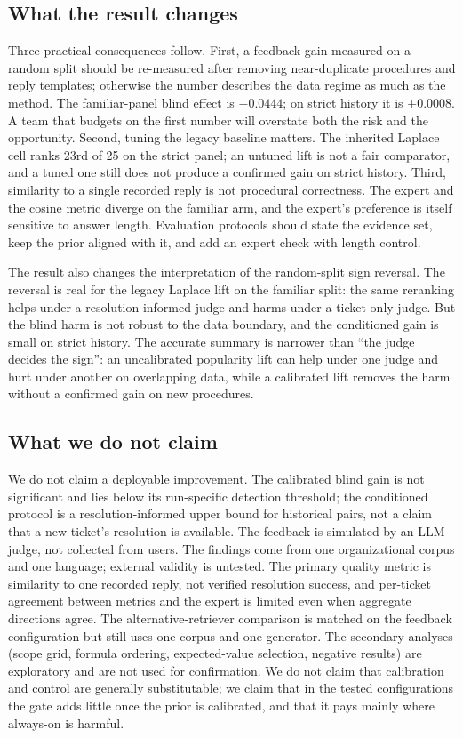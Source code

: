 \documentclass{ieeeaccess}
\begin{document}
\subsection{What the result changes}
Three practical consequences follow. First, a feedback gain measured on a random
split should be re-measured after removing near-duplicate procedures and reply
templates; otherwise the number describes the data regime as much as the method.
The familiar-panel blind effect is $-0.0444$; on strict history it is $+0.0008$.
A team that budgets on the first number will overstate both the risk and the
opportunity. Second, tuning the legacy baseline matters. The inherited Laplace cell
ranks 23rd of 25 on the strict panel; an untuned lift is not a fair comparator, and
a tuned one still does not produce a confirmed gain on strict history. Third,
similarity to a single recorded reply is not procedural correctness. The expert and
the cosine metric diverge on the familiar arm, and the expert's preference is
itself sensitive to answer length. Evaluation protocols should state the evidence
set, keep the prior aligned with it, and add an expert check with length control.

The result also changes the interpretation of the random-split sign reversal. The
reversal is real for the legacy Laplace lift on the familiar split: the same
reranking helps under a resolution-informed judge and harms under a ticket-only
judge. But the blind harm is not robust to the data boundary, and the conditioned
gain is small on strict history. The accurate summary is narrower than ``the judge
decides the sign'': an uncalibrated popularity lift can help under one judge and
hurt under another on overlapping data, while a calibrated lift removes the harm
without a confirmed gain on new procedures.

\subsection{What we do not claim}
We do not claim a deployable improvement. The calibrated blind gain is not
significant and lies below its run-specific detection threshold; the conditioned
protocol is a resolution-informed upper bound for historical pairs, not a claim that
a new ticket's resolution is available. The feedback is simulated by an LLM judge,
not collected from users. The findings come from one organizational corpus and one
language; external validity is untested. The primary quality metric is similarity
to one recorded reply, not verified resolution success, and per-ticket agreement
between metrics and the expert is limited even when aggregate directions agree.
The alternative-retriever comparison is matched on the feedback configuration but
still uses one corpus and one generator. The secondary analyses (scope grid, formula
ordering, expected-value selection, negative results) are exploratory and are not
used for confirmation. We do not claim that calibration and control are generally
substitutable; we claim that in the tested configurations the gate adds little once
the prior is calibrated, and that it pays mainly where always-on is harmful.
\end{document}
